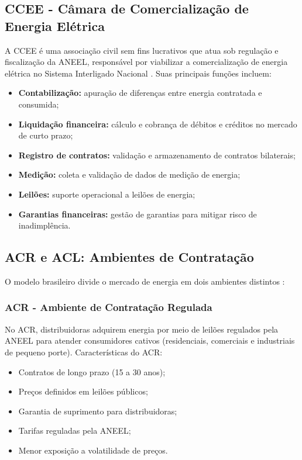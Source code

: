 \subsection{CCEE - Câmara de Comercialização de Energia Elétrica}

A CCEE é uma associação civil sem fins lucrativos que atua sob regulação e fiscalização da ANEEL, responsável por viabilizar a comercialização de energia elétrica no Sistema Interligado Nacional \cite{ccee2023}. Suas principais funções incluem:

\begin{itemize}
    \item \textbf{Contabilização:} apuração de diferenças entre energia contratada e consumida;
    \item \textbf{Liquidação financeira:} cálculo e cobrança de débitos e créditos no mercado de curto prazo;
    \item \textbf{Registro de contratos:} validação e armazenamento de contratos bilaterais;
    \item \textbf{Medição:} coleta e validação de dados de medição de energia;
    \item \textbf{Leilões:} suporte operacional a leilões de energia;
    \item \textbf{Garantias financeiras:} gestão de garantias para mitigar risco de inadimplência.
\end{itemize}
\subsection{ACR e ACL: Ambientes de Contratação}

O modelo brasileiro divide o mercado de energia em dois ambientes distintos \cite{aneel2022}:

\subsubsection{ACR - Ambiente de Contratação Regulada}

No ACR, distribuidoras adquirem energia por meio de leilões regulados pela ANEEL para atender consumidores cativos (residenciais, comerciais e industriais de pequeno porte). Características do ACR:

\begin{itemize}
    \item Contratos de longo prazo (15 a 30 anos);
    \item Preços definidos em leilões públicos;
    \item Garantia de suprimento para distribuidoras;
    \item Tarifas reguladas pela ANEEL;
    \item Menor exposição a volatilidade de preços.
\end{itemize}

